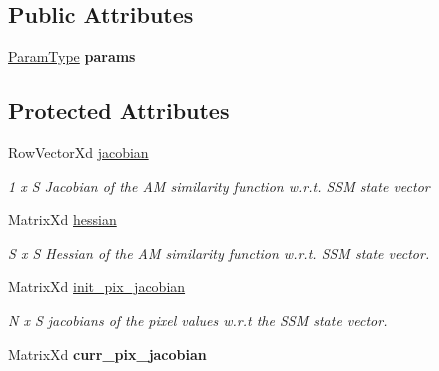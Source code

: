 \subsection*{Public Attributes}
\begin{DoxyCompactItemize}
\item 
\hypertarget{classFALK_a15721db6c945f66c847b76e7a55e850e}{\hyperlink{structFALKParams}{Param\-Type} {\bfseries params}}\label{classFALK_a15721db6c945f66c847b76e7a55e850e}

\end{DoxyCompactItemize}
\subsection*{Protected Attributes}
\begin{DoxyCompactItemize}
\item 
\hypertarget{classFALK_a6fd04c140915ae2c95e2ffe4954ea14b}{Row\-Vector\-Xd \hyperlink{classFALK_a6fd04c140915ae2c95e2ffe4954ea14b}{jacobian}}\label{classFALK_a6fd04c140915ae2c95e2ffe4954ea14b}

\begin{DoxyCompactList}\small\item\em 1 x S Jacobian of the A\-M similarity function w.\-r.\-t. S\-S\-M state vector \end{DoxyCompactList}\item 
\hypertarget{classFALK_a9e7d06e0380210c65dd78c3661607c98}{Matrix\-Xd \hyperlink{classFALK_a9e7d06e0380210c65dd78c3661607c98}{hessian}}\label{classFALK_a9e7d06e0380210c65dd78c3661607c98}

\begin{DoxyCompactList}\small\item\em S x S Hessian of the A\-M similarity function w.\-r.\-t. S\-S\-M state vector. \end{DoxyCompactList}\item 
\hypertarget{classFALK_a60ac78fa548216594bac3186d8952517}{Matrix\-Xd \hyperlink{classFALK_a60ac78fa548216594bac3186d8952517}{init\-\_\-pix\-\_\-jacobian}}\label{classFALK_a60ac78fa548216594bac3186d8952517}

\begin{DoxyCompactList}\small\item\em N x S jacobians of the pixel values w.\-r.\-t the S\-S\-M state vector. \end{DoxyCompactList}\item 
\hypertarget{classFALK_a1818731dc14e4cc2251b5ab6a8fc13c8}{Matrix\-Xd {\bfseries curr\-\_\-pix\-\_\-jacobian}}\label{classFALK_a1818731dc14e4cc2251b5ab6a8fc13c8}


\end{DoxyCompactItemize}
